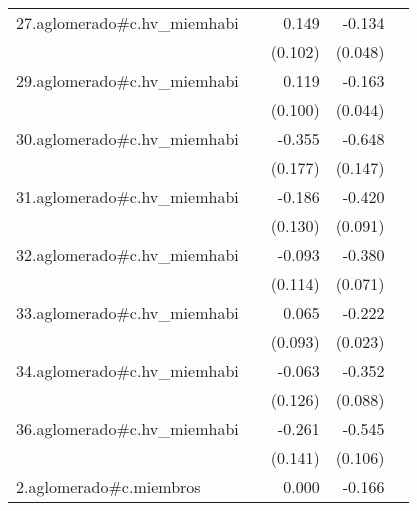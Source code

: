 {\begin{longtable}{l*{4}{D{.}{.}{-1}}}
\addlinespace
27.aglomerado#c.hv\_miemhabi&                     &       0.149         &      -0.134\sym{**} &                     \\
            &                     &     (0.102)         &     (0.048)         &                     \\
\addlinespace
29.aglomerado#c.hv\_miemhabi&                     &       0.119         &      -0.163\sym{***}&                     \\
            &                     &     (0.100)         &     (0.044)         &                     \\
\addlinespace
30.aglomerado#c.hv\_miemhabi&                     &      -0.355\sym{*}  &      -0.648\sym{***}&                     \\
            &                     &     (0.177)         &     (0.147)         &                     \\
\addlinespace
31.aglomerado#c.hv\_miemhabi&                     &      -0.186         &      -0.420\sym{***}&                     \\
            &                     &     (0.130)         &     (0.091)         &                     \\
\addlinespace
32.aglomerado#c.hv\_miemhabi&                     &      -0.093         &      -0.380\sym{***}&                     \\
            &                     &     (0.114)         &     (0.071)         &                     \\
\addlinespace
33.aglomerado#c.hv\_miemhabi&                     &       0.065         &      -0.222\sym{***}&                     \\
            &                     &     (0.093)         &     (0.023)         &                     \\
\addlinespace
34.aglomerado#c.hv\_miemhabi&                     &      -0.063         &      -0.352\sym{***}&                     \\
            &                     &     (0.126)         &     (0.088)         &                     \\
\addlinespace
36.aglomerado#c.hv\_miemhabi&                     &      -0.261         &      -0.545\sym{***}&                     \\
            &                     &     (0.141)         &     (0.106)         &                     \\
\addlinespace
2.aglomerado#c.miembros&                     &       0.000         &      -0.166\sym{***}&                     \\

\end{longtable}}
